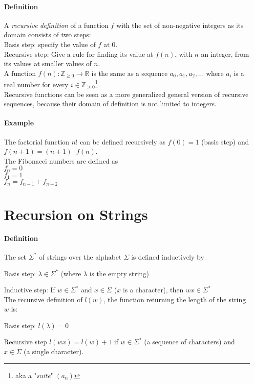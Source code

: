 \documentclass[10pt,a4paper]{book}
\newcommand{\R}{\mathbb{R}}
\newcommand{\Z}{\mathbb{Z}}
\newcommand{\ind}{\hspace*{\parindent}}
\begin{document}
\paragraph*{Definition}
A \textit{recursive definition} of a function $f$ with the set of non-negative integers as its domain consists of two steps:\\
\ind Basis step: specify the value of $f$ at 0.\\
\ind Recursive step: Give a rule for finding its value at $f(n)$, with $n$ an integer, from its values at smaller values of $n$.\\
A function $f(n): \Z_{\geqslant 0} \to \R$ is the same as a sequence $a_0,a_1,a_2,...$ where $a_i$ is a real number for every $i \in \Z_{\geqslant 0}$\footnote{aka a "\textit{suite}" $(a_n)$}.\\
Recursive functions can be seen as a more generalized general version of recursive sequences, because their domain of definition is not limited to integers.
\paragraph*{Example}
The factorial function $n!$ can be defined recursively as $f(0)=1$ (basis step) and $f(n+1)=(n+1)\cdot f(n)$.\\
The Fibonacci numbers are defined as\\
$f_{0}=0$\\$f_{1}=1$\\$f_{n}=f_{n-1}+f_{n-2}$
\section{Recursion on Strings}
\paragraph*{Definition}
The set $\Sigma^{*}$ of strings over the alphabet $\Sigma$ is defined inductively by\par
Basis step: $\lambda \in \Sigma^{*}$ (where $\lambda$ is the empty string)\par
Inductive step: If $w \in \Sigma^{*}$ and $x \in \Sigma$ ($x$ is a character), then $wx \in \Sigma^{*}$\\
The recursive definition of $l(w)$, the function returning the length of the string $w$ is:\par
Basis step: $l(\lambda)=0$\par
Recursive step $l(wx)=l(w)+1$ if $w\in \Sigma^{*}$ (a sequence of characters) and $x \in \Sigma$ (a single character).
\end{document}
